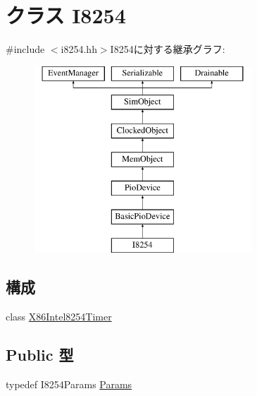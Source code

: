 \hypertarget{classX86ISA_1_1I8254}{
\section{クラス I8254}
\label{classX86ISA_1_1I8254}
}


{\ttfamily \#include $<$i8254.hh$>$}I8254に対する継承グラフ:\begin{figure}[H]
\begin{center}
\leavevmode
\includegraphics[height=7cm]{classX86ISA_1_1I8254}
\end{center}
\end{figure}
\subsection*{構成}
\begin{DoxyCompactItemize}
\item 
class \hyperlink{classX86ISA_1_1I8254_1_1X86Intel8254Timer}{X86Intel8254Timer}
\end{DoxyCompactItemize}
\subsection*{Public 型}
\begin{DoxyCompactItemize}
\item 
typedef I8254Params \hyperlink{classX86ISA_1_1I8254_aed9bbf7fa13cb3e5f1c7805d04bffb78}{Params}
\end{DoxyCompactItemize}
